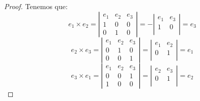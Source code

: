 \begin{proof} Tenemos que:
    \begin{equation*}
        e_1\times e_2 = \left|\begin{array}{ccc}
            e_1 & e_2 & e_3 \\
            1 & 0 & 0 \\
            0 & 1 & 0
        \end{array}\right| =
        - \left|\begin{array}{cc}
            e_1 & e_3 \\
            1 & 0 \\
        \end{array}\right|
        = e_3
    \end{equation*}
    \begin{equation*}
        e_2\times e_3 = \left|\begin{array}{ccc}
            e_1 & e_2 & e_3 \\
            0 & 1 & 0 \\
            0 & 0 & 1
        \end{array}\right| =
         \left|\begin{array}{cc}
            e_1 & e_2 \\
            0 & 1 \\
        \end{array}\right|
        = e_1
    \end{equation*}
    \begin{equation*}
        e_3\times e_1 = \left|\begin{array}{ccc}
            e_1 & e_2 & e_3 \\
            0 & 0 & 1 \\
            1 & 0 & 0
        \end{array}\right| =
         \left|\begin{array}{cc}
            e_2 & e_3 \\
            0 & 1 \\
        \end{array}\right|
        = e_2
    \end{equation*}
\end{proof}

